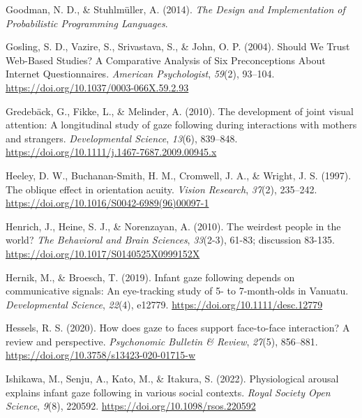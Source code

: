 \documentclass[
  man,mask,floatsintext]{apa7}
\newlength{\cslhangindent}
\newlength{\cslentryspacingunit} %
\newenvironment{CSLReferences}[2] %
 {%
  \setlength{\parindent}{0pt}
  \ifodd #1
  \let\oldpar\par
  \def\par{\hangindent=\cslhangindent\oldpar}
  \fi
  \setlength{\parskip}{#2\cslentryspacingunit}
 }%
 {}
\begin{document}
\begin{CSLReferences}{1}{0}
\leavevmode{}%
Goodman, N. D., \& Stuhlmüller, A. (2014). \emph{The {Design} and {Implementation} of {Probabilistic Programming Languages}}.

\leavevmode{}%
Gosling, S. D., Vazire, S., Srivastava, S., \& John, O. P. (2004). Should {We Trust Web-Based Studies}? {A Comparative Analysis} of {Six Preconceptions About Internet Questionnaires}. \emph{American Psychologist}, \emph{59}(2), 93--104. \url{https://doi.org/10.1037/0003-066X.59.2.93}

\leavevmode{}%
Gredebäck, G., Fikke, L., \& Melinder, A. (2010). The development of joint visual attention: A longitudinal study of gaze following during interactions with mothers and strangers. \emph{Developmental Science}, \emph{13}(6), 839--848. \url{https://doi.org/10.1111/j.1467-7687.2009.00945.x}

\leavevmode{}%
Heeley, D. W., Buchanan-Smith, H. M., Cromwell, J. A., \& Wright, J. S. (1997). The oblique effect in orientation acuity. \emph{Vision Research}, \emph{37}(2), 235--242. \url{https://doi.org/10.1016/S0042-6989(96)00097-1}

\leavevmode{}%
Henrich, J., Heine, S. J., \& Norenzayan, A. (2010). The weirdest people in the world? \emph{The Behavioral and Brain Sciences}, \emph{33}(2-3), 61-83; discussion 83-135. \url{https://doi.org/10.1017/S0140525X0999152X}

\leavevmode{}%
Hernik, M., \& Broesch, T. (2019). Infant gaze following depends on communicative signals: {An} eye-tracking study of 5- to 7-month-olds in {Vanuatu}. \emph{Developmental Science}, \emph{22}(4), e12779. \url{https://doi.org/10.1111/desc.12779}

\leavevmode{}%
Hessels, R. S. (2020). How does gaze to faces support face-to-face interaction? {A} review and perspective. \emph{Psychonomic Bulletin \& Review}, \emph{27}(5), 856--881. \url{https://doi.org/10.3758/s13423-020-01715-w}

\leavevmode{}%
Ishikawa, M., Senju, A., Kato, M., \& Itakura, S. (2022). Physiological arousal explains infant gaze following in various social contexts. \emph{Royal Society Open Science}, \emph{9}(8), 220592. \url{https://doi.org/10.1098/rsos.220592}


\end{CSLReferences}
\end{document}
